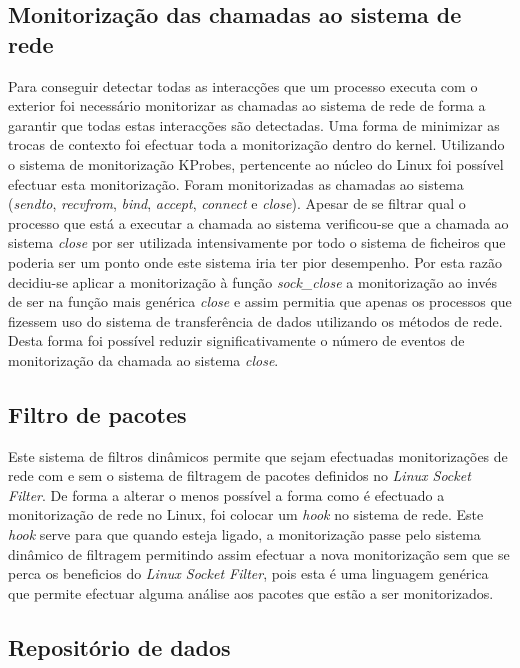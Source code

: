 \documentclass[runningheads,a4paper]{llncs}
\begin{document}
\subsection*{Monitorização das chamadas ao sistema de rede}
\label{sub:mon_syscalls}

Para conseguir detectar todas as interacções que um processo executa com o exterior foi necessário monitorizar as chamadas ao sistema de rede de forma a garantir que todas estas interacções são detectadas. Uma forma de minimizar as trocas de contexto foi efectuar toda a monitorização dentro do kernel. Utilizando o sistema de monitorização KProbes, pertencente ao núcleo do Linux foi possível efectuar esta monitorização. Foram monitorizadas as chamadas ao sistema (\textit{sendto}, \textit{recvfrom}, \textit{bind}, \textit{accept}, \textit{connect} e  \textit{close}).
Apesar de se filtrar qual o processo que está a executar a chamada ao sistema verificou-se que a chamada ao sistema \textit{close} por ser utilizada intensivamente por todo o sistema de ficheiros que poderia ser um ponto onde este sistema iria ter pior desempenho. Por esta razão decidiu-se aplicar a monitorização à função \textit{sock\_close} a monitorização ao invés de ser na função mais genérica \textit{close} e assim permitia que apenas os processos que fizessem uso do sistema de transferência de dados utilizando os métodos de rede. Desta forma foi possível reduzir significativamente o número de eventos de monitorização da chamada ao sistema \textit{close}.

\subsection*{Filtro de pacotes}
\label{sub:packet_filter}

Este sistema de filtros dinâmicos permite que sejam efectuadas monitorizações de rede com e sem o sistema de filtragem de pacotes definidos no \textit{Linux Socket Filter}. De forma a alterar o menos possível a forma como é efectuado a monitorização de rede no Linux, foi colocar um \textit{hook} no sistema de rede. Este \textit{hook} serve para que quando esteja ligado, a monitorização passe pelo sistema dinâmico de filtragem permitindo assim efectuar a nova monitorização sem que se perca os beneficios do \textit{Linux Socket Filter}, pois esta é uma linguagem genérica que permite efectuar alguma análise aos pacotes que estão a ser monitorizados.


\subsection*{Repositório de dados}
\label{sub:data_repository}
\end{document}
